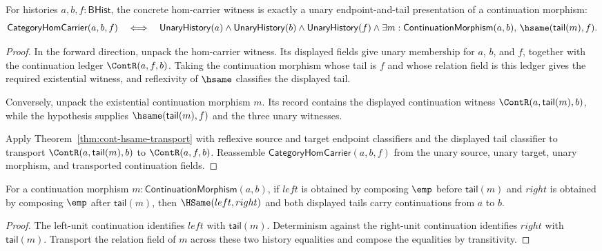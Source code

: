 \begin{theorem}
\label{thm:category-hom-carrier-continuation-morphism-tail-correspondence}
For histories $a,b,f:\mathsf{BHist}$, the concrete hom-carrier witness is
exactly a unary endpoint-and-tail presentation of a continuation morphism:
$$
\mathsf{CategoryHomCarrier}(a,b,f)
\quad\Longleftrightarrow\quad
\mathsf{UnaryHistory}(a)\wedge
\mathsf{UnaryHistory}(b)\wedge
\mathsf{UnaryHistory}(f)\wedge
\exists m:\mathsf{ContinuationMorphism}(a,b),\,
\hsame(\mathsf{tail}(m),f).
$$
\end{theorem}
\begin{proof}
In the forward direction, unpack the hom-carrier witness. Its displayed
fields give unary membership for $a$, $b$, and $f$, together with the
continuation ledger $\ContR(a,f,b)$. Taking the continuation morphism whose
tail is $f$ and whose relation field is this ledger gives the required
existential witness, and reflexivity of $\hsame$ classifies the displayed tail.

Conversely, unpack the existential continuation morphism $m$. Its record
contains the displayed continuation witness
$\ContR(a,\mathsf{tail}(m),b)$, while the hypothesis supplies
$\hsame(\mathsf{tail}(m),f)$ and the three unary witnesses.

Apply Theorem~\ref{thm:cont-hsame-transport} with reflexive source and target
endpoint classifiers and the displayed tail classifier to transport
$\ContR(a,\mathsf{tail}(m),b)$ to $\ContR(a,f,b)$. Reassemble
$\mathsf{CategoryHomCarrier}(a,b,f)$ from the unary source, unary target,
unary morphism, and transported continuation fields.
\end{proof}

\begin{theorem}
\label{thm:continuation-morphism-tail-identity-square-closed}
For a continuation morphism $m:\mathsf{ContinuationMorphism}(a,b)$, if $left$
is obtained by composing $\emp$ before $\mathsf{tail}(m)$ and $right$ is
obtained by composing $\emp$ after $\mathsf{tail}(m)$, then
$\HSame(left,right)$ and both displayed tails carry continuations from $a$ to
$b$.
\end{theorem}
\begin{proof}
The left-unit continuation identifies $left$ with $\mathsf{tail}(m)$.
Determinism against the right-unit continuation identifies $right$ with
$\mathsf{tail}(m)$. Transport the relation field of $m$ across these two
history equalities and compose the equalities by transitivity.
\end{proof}

